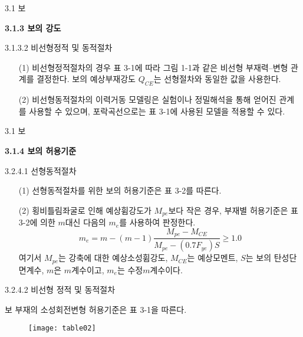 \begin{frame}{3.1 보}

	\textbf{3.1.3 보의 강도}

3.1.3.2 비선형정적 및 동적절차

\begin{enumerate}
	\item[(1)] 비선형정적절차의 경우 표 3-1에 따라 그림 1-1과 같은 비선형 부재력--변형 관계를 결정한다. 보의 예상부재강도 $Q_{CE}$는 선형절차와 동일한 값을 사용한다. 
	\item[(2)] 비선형동적절차의 이력거동 모델링은 실험이나 정밀해석을 통해 얻어진 관계를 사용할 수 있으며, 포락곡선으로는 표 3-1에 사용된 모델을 적용할 수 있다. 
\end{enumerate}
\end{frame}	


	\begin{frame}{3.1 보}

	\textbf{3.1.4 보의 허용기준}

3.2.4.1 선형동적절차

\begin{enumerate}
	\item[(1)] 선형동적절차를 위한 보의 허용기준은 표 3-2를 따른다. 
	\item[(2)] 횡비틀림좌굴로 인해 예상휨강도가 $M_{pe}$보다 작은 경우, 부재별 허용기준은 표 3-2에 의한 $m$대신 다음의 $m_e$를 사용하여 판정한다. 
	\[m_e = m - (m - 1)\frac{M_{pe} - M_{CE}}{M_{pe} - (0.7F_{ye})S} \geq 1.0\]
	\noindent 여기서 $M_{pe}$는 강축에 대한 예상소성휨강도, $M_{CE}$는 예상모멘트, $S$는 보의 탄성단면계수, $m$은 $m$계수이고, $m_e$는 수정$m$계수이다. 
\end{enumerate}

3.2.4.2 비선형 정적 및 동적절차	

보 부재의 소성회전변형 허용기준은 표 3-1을 따른다. 
\end{frame}	

	\begin{frame}
	\begin{figure}
		\centering
		\texttt{[image: table02]}
	\end{figure}
\end{frame}	
